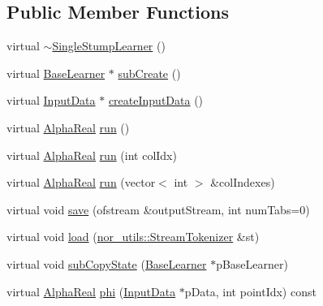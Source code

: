 \subsection*{Public Member Functions}
\begin{DoxyCompactItemize}
\item 
virtual \hyperlink{classMultiBoost_1_1SingleStumpLearner_aa5361080940bbf51d1f140907d9f53da}{$\sim$SingleStumpLearner} ()
\item 
virtual \hyperlink{classMultiBoost_1_1BaseLearner}{BaseLearner} $\ast$ \hyperlink{classMultiBoost_1_1SingleStumpLearner_ac78a95b491c3cef2362c6459f2465288}{subCreate} ()
\item 
virtual \hyperlink{classMultiBoost_1_1InputData}{InputData} $\ast$ \hyperlink{classMultiBoost_1_1SingleStumpLearner_af8c1f23328ee98a5ea49aa2b4f9874ff}{createInputData} ()
\item 
virtual \hyperlink{Defaults_8h_a80184c4fd10ab70a1a17c5f97dcd1563}{AlphaReal} \hyperlink{classMultiBoost_1_1SingleStumpLearner_a9cd7bfe1a0905857993eec0dd462a879}{run} ()
\item 
virtual \hyperlink{Defaults_8h_a80184c4fd10ab70a1a17c5f97dcd1563}{AlphaReal} \hyperlink{classMultiBoost_1_1SingleStumpLearner_a1d247da7a1f0c73043657f290491b3b5}{run} (int colIdx)
\item 
virtual \hyperlink{Defaults_8h_a80184c4fd10ab70a1a17c5f97dcd1563}{AlphaReal} \hyperlink{classMultiBoost_1_1SingleStumpLearner_a4ada99280f17f0d442468c186e20a55b}{run} (vector$<$ int $>$ \&colIndexes)
\item 
virtual void \hyperlink{classMultiBoost_1_1SingleStumpLearner_a25bb9b4151a2a4f547994ef71a2cf152}{save} (ofstream \&outputStream, int numTabs=0)
\item 
virtual void \hyperlink{classMultiBoost_1_1SingleStumpLearner_afa8862221d2dcd260a2ae450ba16f825}{load} (\hyperlink{classnor__utils_1_1StreamTokenizer}{nor\_\-utils::StreamTokenizer} \&st)
\item 
virtual void \hyperlink{classMultiBoost_1_1SingleStumpLearner_a81fc70ee14b9714289f998977a8e0e1b}{subCopyState} (\hyperlink{classMultiBoost_1_1BaseLearner}{BaseLearner} $\ast$pBaseLearner)
\item 
virtual \hyperlink{Defaults_8h_a80184c4fd10ab70a1a17c5f97dcd1563}{AlphaReal} \hyperlink{classMultiBoost_1_1SingleStumpLearner_ae711e053b01ac6f1d57de77c439e18cd}{phi} (\hyperlink{classMultiBoost_1_1InputData}{InputData} $\ast$pData, int pointIdx) const 
\end{DoxyCompactItemize}
